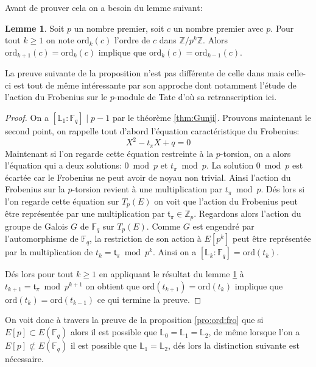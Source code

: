 \documentclass[10pt,a4paper]{book}
\theoremstyle{plain}
\theoremstyle{definition}
\newtheorem{lem}[thm]{Lemme}
\theoremstyle{definition}
\theoremstyle{definition}
\theoremstyle{definition}
\theoremstyle{remark}
\theoremstyle{remark}
\begin{document}
Avant de prouver cela on a besoin du lemme suivant:

\begin{lem}
\label{lem:ord}
Soit $p$ un nombre premier, soit $c$ un nombre premier avec $p$. Pour tout $k \geqslant 1$ on note $\mathrm{ord}_k(c)$ l'ordre de $c$ dans $\mathbb{Z}/p^k\mathbb{Z}$. Alors $\mathrm{ord}_{k+1}(c)=\mathrm{ord}_k(c)$ implique que $\mathrm{ord}_k(c) = \mathrm{ord}_{k-1}(c)$.
\end{lem}

La preuve suivante de la proposition \label{pro:ord:fro} n'est pas différente de celle dans \cite[Proposition 5]{DeFeo11} mais celle-ci est tout de même intéressante par son approche dont notamment l'étude de l'action du Frobenius sur le $p$-module de Tate d'où sa retranscription ici.

\begin{proof}
On a $[\mathbb{L}_1:\mathbb{F}_q] \mid p-1$ par le théorème \ref{thm:Gunji}. Prouvons maintenant le second point,
on rappelle tout d'abord l'équation caractéristique du Frobenius:
\begin{equation}
X^2 - t_{\pi}X + q = 0
\end{equation}
Maintenant si l'on regarde cette équation restreinte à la $p$-torsion, on a alors l'équation qui a deux solutions: $0 \bmod p$ et $t_{\pi} \bmod p$. La solution $0 \bmod p$ est écartée car le Frobenius ne peut avoir de noyau non trivial. Ainsi l'action du Frobenius sur la $p$-torsion revient à une multiplication par $t_{\pi} \bmod p$. Dés lors si l'on regarde cette équation sur $T_{p}(E)$ on voit que l'action du Frobenius peut être représentée par une multiplication par $\mathfrak{t}_{\pi} \in \mathbb{Z}_{p} $. 
Regardons alors l'action du groupe de Galois $G$ de $\mathbb{F}_q$ sur $T_{p}(E)$. Comme $G$ est engendré par l'automorphisme de $\mathbb{F}_q$, la restriction de son action à $E[p^k]$ peut être représentée par la multiplication de $t_k=\mathfrak{t}_{\pi} \bmod p^k$. Ainsi on a $[\mathbb{L}_k:\mathbb{F}_q]=\mathrm{ord}(t_k)$.

Dés lors pour tout $k\geqslant 1$ en appliquant le résultat du lemme \ref{lem:ord} à $t_{k+1}=\mathfrak{t}_{\pi} \bmod p^{k+1}$ on obtient que $\mathrm{ord}(t_{k+1})=\mathrm{ord}(t_{k})$ implique que $\mathrm{ord}(t_{k})=\mathrm{ord}(t_{k-1})$ ce qui termine la preuve.
\end{proof}

On voit donc à travers la preuve de la proposition \ref{pro:ord:fro} que si $E[p] \subset E(\mathbb{F}_q)$ alors il est possible que $\mathbb{L}_0=\mathbb{L}_1=\mathbb{L}_2$, de même lorsque l'on a $E[p] \not\subset E(\mathbb{F}_q)$ il est possible que $\mathbb{L}_1=\mathbb{L}_2$, dés lors la distinction suivante est nécessaire.
\end{document}
